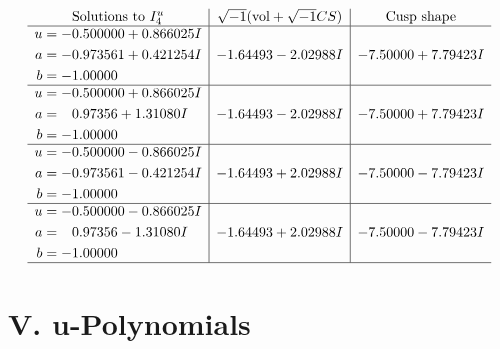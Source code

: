 \documentclass[1p]{elsarticle_modified}
\theoremstyle{definition}
\newcommand{\I}{\sqrt{-1}}
\begin{document}
$$\begin{array}{c|c|c}  
\text{Solutions to }I^u_{4}& \I (\text{vol} + \sqrt{-1}CS) & \text{Cusp shape}\\
 \hline 
\begin{aligned}
u &= -0.500000 + 0.866025 I \\
a &= -0.973561 + 0.421254 I \\
b &= -1.00000\phantom{ +0.000000I}\end{aligned}
 & -1.64493 - 2.02988 I & -7.50000 + 7.79423 I \\ \hline\begin{aligned}
u &= -0.500000 + 0.866025 I \\
a &= \phantom{-}0.97356 + 1.31080 I \\
b &= -1.00000\phantom{ +0.000000I}\end{aligned}
 & -1.64493 - 2.02988 I & -7.50000 + 7.79423 I \\ \hline\begin{aligned}
u &= -0.500000 - 0.866025 I \\
a &= -0.973561 - 0.421254 I \\
b &= -1.00000\phantom{ +0.000000I}\end{aligned}
 & -1.64493 + 2.02988 I & -7.50000 - 7.79423 I \\ \hline\begin{aligned}
u &= -0.500000 - 0.866025 I \\
a &= \phantom{-}0.97356 - 1.31080 I \\
b &= -1.00000\phantom{ +0.000000I}\end{aligned}
 & -1.64493 + 2.02988 I & -7.50000 - 7.79423 I\\
 \hline 
 \end{array}$$\newpage
\newpage\renewcommand{\arraystretch}{1}
\centering \section*{ V. u-Polynomials}
\end{document}
